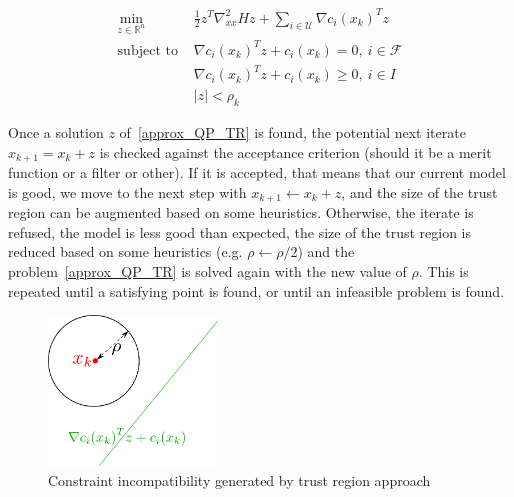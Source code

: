 \begin{equation}
  \begin{array}{ll}
    \min\limits_{z\in \mathbb{R}^n}{} & \frac{1}{2}z^T\nabla_{xx}^2Hz + \sum_{i\in\mathcal{U}}{\nabla c_i(x_k)}^T z \\
    \text{subject to } & {\nabla c_i(x_k)}^T z+c_i(x_k)=0,\ i\in \mathcal{F} \\
                       & {\nabla c_i(x_k)}^T z+c_i(x_k)\geq 0,\ i\in I\\
                       & |z|<\rho_k
  \end{array}
\label{approx_QP_TR}
\end{equation}

Once a solution $z$ of~\ref{approx_QP_TR} is found, the potential next iterate $x_{k+1} = x_k + z$ is checked against the acceptance criterion (should it be a merit function or a filter or other).
If it is accepted, that means that our current model is good, we move to the next step with $x_{k+1} \leftarrow x_k + z$, and the size of the trust region can be augmented based on some heuristics.
Otherwise, the iterate is refused, the model is less good than expected, the size of the trust region is reduced based on some heuristics (e.g. $\rho\leftarrow\rho/2$) and the problem~\ref{approx_QP_TR} is solved again with the new value of $\rho$.
This is repeated until a satisfying point is found, or until an infeasible problem is found.

\begin{figure}
  \centering
  \includegraphics[width=0.4\textwidth]{trust_region_incompatible.pdf}
  \caption{Constraint incompatibility generated by trust region approach}
\label{fig:TR_incompatible}
\end{figure}

